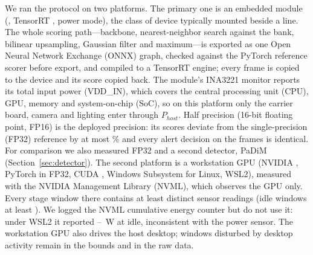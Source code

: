 We ran the protocol on two platforms. The primary one is an embedded \JetsonModel{} module (\JetsonLft, TensorRT \JetsonTensorRT, \JetsonPowerMode{} power mode), the class of device typically mounted beside a line. The whole scoring path---backbone, nearest-neighbor search against the bank, bilinear upsampling, Gaussian filter and maximum---is exported as one Open Neural Network Exchange (ONNX) graph, checked against the PyTorch reference scorer before export, and compiled to a TensorRT engine; every frame is copied to the device and its score copied back. The module's INA3221 monitor reports its total input power (VDD\_IN), which covers the central processing unit (CPU), GPU, memory and system-on-chip (SoC), so on this platform only the carrier board, camera and lighting enter through $P_{host}$. Half precision (16-bit floating point, FP16) is the deployed precision: its scores deviate from the single-precision (FP32) reference by at most \JetsonPcHalfMaxRelErr\% and every alert decision on the \BenchFrames{} frames is identical. For comparison we also measured FP32 and a second detector, PaDiM~\cite{defard2021padim} (Section~\ref{sec:detector}). The second platform is a workstation GPU (NVIDIA \GpuName{}, PyTorch \TorchVersion{} in FP32, CUDA \CudaRuntime, Windows Subsystem for Linux, WSL2), measured with the NVIDIA Management Library (NVML), which observes the GPU only. Every stage window there contains at least \StageReadingsMin{} distinct sensor readings (idle windows at least \IdleReadingsMin). We logged the NVML cumulative energy counter but do not use it: under WSL2 it reported \CounterIdleMinW--\CounterIdleMaxW~W at idle, inconsistent with the power sensor. The workstation GPU also drives the host desktop; windows disturbed by desktop activity remain in the bounds and in the raw data.


